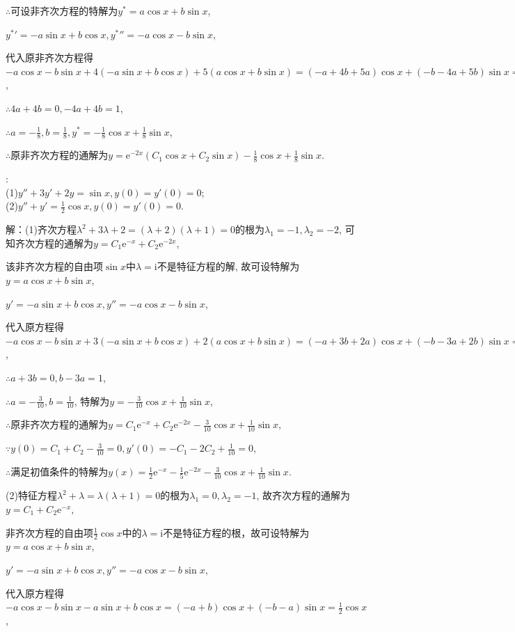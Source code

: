 \documentclass[12pt,UTF8]{ctexart}
\newcommand{\me}[0]{\mathrm e}
\newcommand{\m}[0]{\mathrm }
\begin{document}
\begin{enumerate}
$\therefore$可设非齐次方程的特解为$y^*=a\cos x+b\sin x$,

${y^*}'=-a\sin x+b\cos x,{y^*}''=-a\cos x-b\sin x$,

代入原非齐次方程得$-a\cos x-b\sin x+4(-a\sin x+b\cos x)+5(a\cos x+b\sin x)=(-a+4b+5a)\cos x+(-b-4a+5b)\sin x=(4a+4b)\cos x+(-4a+4b)\sin x=\sin x$,

$\therefore 4a+4b=0,-4a+4b=1$,

$\therefore a=-\frac18,b=\frac18,y^*=-\frac18\cos x+\frac18\sin x$,

$\therefore$原非齐次方程的通解为$y=\me^{-2x}(C_1\cos x+C_2\sin x)-\frac18\cos x+\frac18\sin x$.

:\\
(1)$y''+3y'+2y=\sin x,y(0)=y'(0)=0$;\\
(2)$y''+y'=\frac12\cos x,y(0)=y'(0)=0$.

解：(1)齐次方程$\lambda^2+3\lambda+2=(\lambda+2)(\lambda+1)=0$的根为$\lambda_1=-1,\lambda_2=-2$, 可知齐次方程的通解为$y=C_1\me^{-x}+C_2\me^{-2x}$,

该非齐次方程的自由项$\sin x$中$\lambda=\m i$不是特征方程的解, 故可设特解为$y=a\cos x+b\sin x$,

$y'=-a\sin x+b\cos x,y''=-a\cos x-b\sin x$,

代入原方程得$-a\cos x-b\sin x+3(-a\sin x+b\cos x)+2(a\cos x+b\sin x)=(-a+3b+2a)\cos x+(-b-3a+2b)\sin x=(a+3b)\cos x+(b-3a)\sin x=\sin x$,

$\therefore a+3b=0,b-3a=1$,

$\therefore a=-\frac3{10},b=\frac1{10}$, 特解为$y=-\frac3{10}\cos x+\frac1{10}\sin x$,

$\therefore$原非齐次方程的通解为$y=C_1\me^{-x}+C_2\me^{-2x}-\frac3{10}\cos x+\frac1{10}\sin x$,

$\because y(0)=C_1+C_2-\frac3{10}=0,y'(0)=-C_1-2C_2+\frac1{10}=0$,

$\therefore$满足初值条件的特解为$y(x)=\frac12\me^{-x}-\frac15\me^{-2x}-\frac3{10}\cos x+\frac1{10}\sin x$.

(2)特征方程$\lambda^2+\lambda=\lambda(\lambda+1)=0$的根为$\lambda_1=0,\lambda_2=-1$, 故齐次方程的通解为$y=C_1+C_2\me^{-x}$,

非齐次方程的自由项$\frac12\cos x$中的$\lambda=\m i$不是特征方程的根，故可设特解为$y=a\cos x+b\sin x$,

$y'=-a\sin x+b\cos x,y''=-a\cos x-b\sin x$,

代入原方程得$-a\cos x-b\sin x-a\sin x+b\cos x=(-a+b)\cos x+(-b-a)\sin x=\frac12\cos x$,


\end{enumerate}
\end{document}
